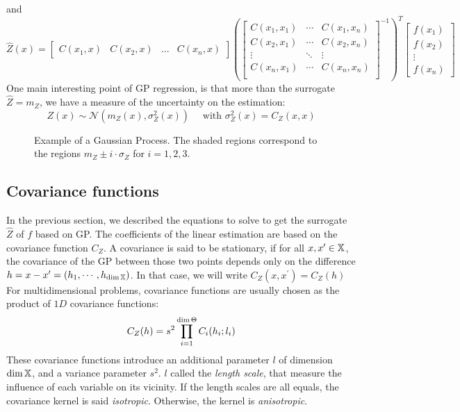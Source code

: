 \documentclass[../../Main_ManuscritThese.tex]{subfiles}
\newcommand\imgpath{/home/victor/acadwriting/Manuscrit/Text/Chapter4/img/}
\begin{document}
and
\begin{equation}
  \hat{Z}(x) =
      \begin{bmatrix}
      C(x_1, x) &
      C(x_2, x) &
      \dots &
      C(x_n, x)
      \end{bmatrix}
      \left(\begin{bmatrix} C(x_1, x_1) & \cdots & C(x_1, x_n)\\
      C(x_2, x_1) & \cdots & C(x_2, x_n) \\
      \vdots & \ddots & \vdots  \\
      C(x_n, x_1) & \cdots & C(x_n, x_n) \\
    \end{bmatrix}^{-1}\right)^T
  \begin{bmatrix}
    f(x_1) \\ f(x_2) \\ \vdots \\ f(x_n)
  \end{bmatrix}
\end{equation}
One main interesting point of GP regression, is that more than the surrogate $\hat{Z} = m_Z$, we have a measure of the uncertainty on the estimation:
\begin{equation}
  Z(x) \sim \mathcal{N}\left(m_Z(x), \sigma^2_Z(x)\right) \quad \text{ with } \sigma^2_Z(x) = C_Z(x, x)
\end{equation}

\begin{figure}[ht]
  \centering
  
  \caption{\label{fig:example_GP} Example of a Gaussian Process. The shaded regions correspond to the regions $m_Z \pm i \cdot \sigma_Z$ for $i=1, 2,3$.}
\end{figure}


\subsection{Covariance functions}
\label{sec:cov_fun}
In the previous section, we described the equations to solve to get the surrogate $\hat{Z}$ of $f$ based on GP.
The coefficients of the linear estimation are based on the covariance function $C_Z$.
A covariance is said to be stationary, if for all $x, x^{\prime} \in \mathbb{X}$, the covariance of the GP between those two points depends only on the  difference $h = x-x^{\prime}=(h_1,\cdots, h_{\dim\mathbb{X}})$. In that case, we will write $C_Z(x, x^{\prime}) = C_Z(h)$ 
For multidimensional problems, covariance functions are usually chosen as the product of $1D$ covariance functions:
\begin{equation}
  C_Z(h) = s^2\prod_{i=1}^{\dim \Theta} C_i(h_i;l_i)
\end{equation}
These covariance functions introduce an additional parameter $l$ of dimension $\dim \mathbb{X}$, and a variance parameter $s^2$.
$l$ called the \emph{length scale}, that measure the influence of each variable on its vicinity. If the length scales are all equals, the covariance kernel is said \emph{isotropic}. Otherwise, the kernel is \emph{anisotropic}.
\end{document}
